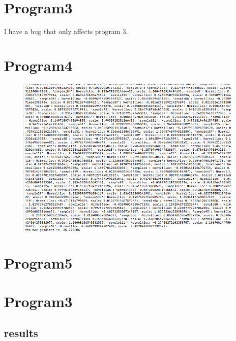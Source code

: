 \documentclass[12pt]{article}%
\theoremstyle{definition}
\begin{document}
	\newpage
	
	\section{Program3}

	I have a bug that only affects program 3.
	
	\newpage
	
	\section{Program4}
	
	\begin{figure}[h]
	\includegraphics[scale=0.7]{p4proposal}
	\end{figure}
	\newpage
		
	\section{Program5}
		
	\begin{figure}[h]
	\end{figure}
	
	

	
	
	
	\section{Program3}
	
	
	
	

		

	
	
	
	
	
	
	\subsection{results}
	

	
	
	
	
	
	
		
	\newpage
	
	
	
	
%	
%	
	
	
\end{document}

